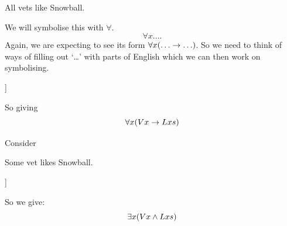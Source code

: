 \begin{samplesent}
	\item All vets like Snowball.
\end{samplesent}
We will symbolise this with $\forall$. $$\forall x\ldots.$$ Again, we are expecting to see its form $\forall x(\ldots\eif\ldots)$. So we need to think of ways of filling out `\ldots' with parts of English which we can then work on symbolising. 
\begin{center}
	\begin{forest}
		[All vets like Snowball\\
		For all $x$:  if \ldots then \ldots\\
		$\forall x(\ldots\eif \ldots)$
		[$x$ is a vet\\$Vx$]
		[$x$ likes Snowball\\$Lxs$]
		]
	\end{forest}
\end{center}
So giving $$\forall x(Vx\rightarrow Lxs)$$

Consider 
\begin{samplesent}
	\item Some vet likes Snowball. 
\end{samplesent}
\begin{center}
	\begin{forest}
		[Some vet likes Snowball\\
		There exists $x$:   \ldots and \ldots\\
		$\exists x(\ldots\eand \ldots)$
		[$x$ is a vet\\$Vx$]
		[$x$ likes Snowball\\$Lxs$]
		]
	\end{forest}
\end{center}So we give:
$$\exists x(Vx\mathbin{\wedge} Lxs)$$

